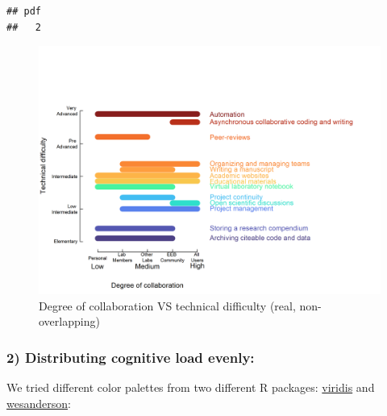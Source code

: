 \documentclass[
  11pt,
]{article}
\begin{document}
\begin{verbatim}
## pdf 
##   2
\end{verbatim}

\begin{figure}
\centering
\includegraphics{../content/images/scatterblob_0.png}
\caption{Degree of collaboration VS technical difficulty (real, non-overlapping)}
\end{figure}

\hypertarget{distributing-cognitive-load-evenly}{%
\subsubsection{2) Distributing cognitive load evenly:}\label{distributing-cognitive-load-evenly}}

We tried different color palettes from two different R packages: \href{https://cran.r-project.org/web/packages/viridis/vignettes/intro-to-viridis.html\#the-color-scales}{viridis} and \href{https://github.com/karthik/wesanderson\#readme}{wesanderson}:
\end{document}
